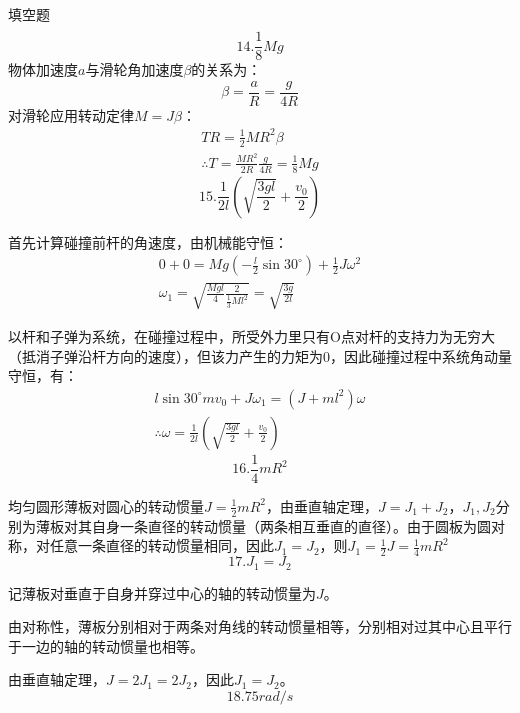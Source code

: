 \documentclass[a4paper,fleqn,twocolumn]{ctexart}
\begin{document}
\begin{section}{填空题}
\begin{align*}
		\end{align*}
		\[14.\frac{1}{8}Mg\]
		物体加速度$ a $与滑轮角加速度$ \beta $的关系为：
		\[\beta=\frac{a}{R}=\frac{g}{4R}\]
		对滑轮应用转动定律$M=J\beta$：
		\begin{gather*}
			TR=\frac{1}{2}MR^2\beta\\
			\therefore T=\frac{MR^2}{2R}\frac{g}{4R}=\frac{1}{8}Mg
		\end{gather*}
		\[15.\frac{1}{2l}\left(\sqrt{\frac{3gl}{2}}+\frac{v_0}{2}\right)\]\par
		首先计算碰撞前杆的角速度，由机械能守恒：
		\begin{gather*}
			0+0=Mg(-\frac{l}{2}\sin 30^\circ)+\frac{1}{2}J\omega^2\\
			\omega_1=\sqrt{\frac{Mgl}{4}\frac{2}{\frac{1}{3}Ml^2}}=\sqrt{\frac{3g}{2l}}
		\end{gather*}\par
		以杆和子弹为系统，在碰撞过程中，所受外力里只有O点对杆的支持力为无穷大（抵消子弹沿杆方向的速度），但该力产生的力矩为0，因此碰撞过程中系统角动量守恒，有：
		\begin{gather*}
			l\sin 30^\circ mv_0+J\omega_1=(J+ml^2)\omega\\
			\therefore \omega=\frac{1}{2l}\left(\sqrt{\frac{3gl}{2}}+\frac{v_0}{2}\right)
		\end{gather*}
		\[16.\frac{1}{4}mR^2 \]\par		
		均匀圆形薄板对圆心的转动惯量$ J=\frac{1}{2}mR^2 $，由垂直轴定理，$ J=J_1+J_2 $，$ J_1,J_2 $分别为薄板对其自身一条直径的转动惯量（两条相互垂直的直径）。由于圆板为圆对称，对任意一条直径的转动惯量相同，因此$ J_1=J_2 $，则$ J_1=\frac{1}{2}J=\frac{1}{4}mR^2 $
		\[17.J_1=J_2\]\par
		记薄板对垂直于自身并穿过中心的轴的转动惯量为$ J $。\par
		由对称性，薄板分别相对于两条对角线的转动惯量相等，分别相对过其中心且平行于一边的轴的转动惯量也相等。\par
		\par
		由垂直轴定理，$ J=2J_1=2J_2 $，因此$ J_1=J_2 $。
		\[18.75rad/s\]\par

\end{section}
\end{document}
